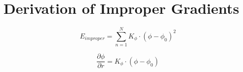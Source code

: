 \section{Derivation of Improper Gradients}
\[E_{improper}=\sum_{n=1}^{N}K_{\phi}\cdot(\phi-\phi_{0})^2\]

\[\frac{\partial \phi}{\partial r}=K_{\phi}\cdot(\phi-\phi_{0})\]
